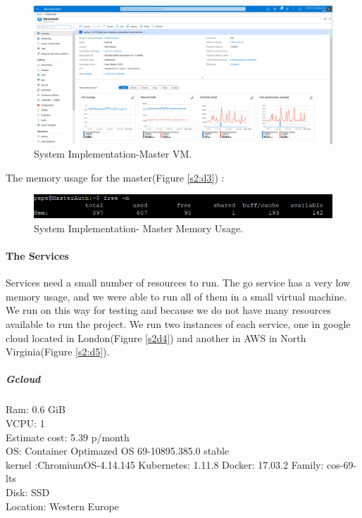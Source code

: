 \begin{figure}[H]
	\begin{center}
		\includegraphics[width=170mm,scale=1]{img/implementation/auth-master-vm.png}
		\caption{System Implementation-Master VM.}
		\label{se:d2}
	\end{center}
	
\end{figure}

The memory usage for the master(Figure \ref{s2:d3}) :
\begin{figure}[H]
	\begin{center}
		\includegraphics[width=170mm,scale=1]{img/implementation/auth-master-memory.png}
		\caption{System Implementation- Master Memory Usage.}
		\label{se:d3}
	\end{center}
	
\end{figure}
\indent
\paragraph{The Services}

Services need a small number of resources to run. The go service has a very low memory usage, and we were able to run all of them in a small virtual machine. We run on this way for testing and because we do not have many resources available to run the project.
We run two instances of each service, one in google cloud located in London(Figure \ref{s2d4}) and another in AWS in North Virginia(Figure \ref{s2:d5}).
\\
\indent
\subparagraph{Gcloud}

\indent
Ram: 0.6 GiB
\\
\indent
VCPU: 1
\\
\indent
Estimate cost: 5.39 p/month
\\
\indent
OS: Container Optimazed OS 69-10895.385.0 stable
\\
\indent
kernel :ChromiumOS-4.14.145 Kubernetes: 1.11.8 Docker: 17.03.2 Family: cos-69-lts 
\\
\indent
Disk: SSD
\\
\indent
Location: Western Europe

